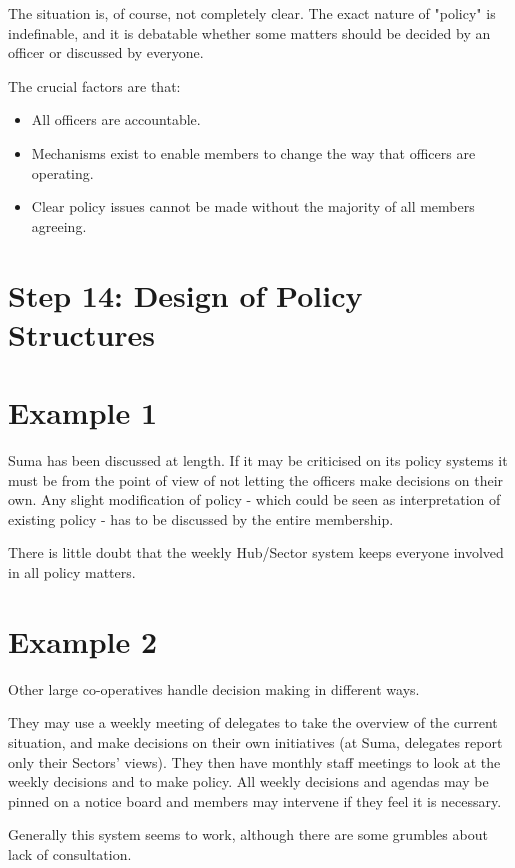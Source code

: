The situation is, of course, not completely clear. The exact nature of "policy" is indefinable, and it is debatable whether some matters should be decided by an officer or discussed by everyone.

The crucial factors are that:

\begin{itemize}
  \item All officers are accountable.

  \item Mechanisms exist to enable members to change the way that officers are operating.

  \item Clear policy issues cannot be made without the majority of all members agreeing.

\end{itemize}

\section*{Step 14: Design of Policy Structures}

\section*{Example 1}
Suma has been discussed at length. If it may be criticised on its policy systems it must be from the point of view of not letting the officers make decisions on their own. Any slight modification of policy - which could be seen as interpretation of existing policy - has to be discussed by the entire membership.

There is little doubt that the weekly Hub/Sector system keeps everyone involved in all policy matters.

\section*{Example 2}
Other large co-operatives handle decision making in different ways.

They may use a weekly meeting of delegates to take the overview of the current situation, and make decisions on their own initiatives (at Suma, delegates report only their Sectors' views). They then have monthly staff meetings to look at the weekly decisions and to make policy. All weekly decisions and agendas may be pinned on a notice board and members may intervene if they feel it is necessary.

Generally this system seems to work, although there are some grumbles about lack of consultation.
